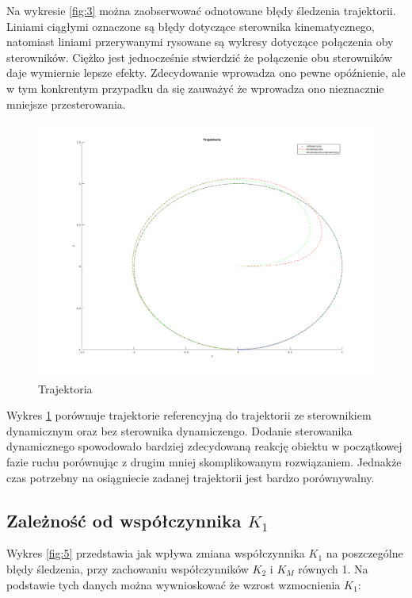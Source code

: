 \documentclass[12pt,a4paper]{article}
\begin{document}
    Na wykresie \ref{fig:3} można zaobserwować odnotowane błędy śledzenia trajektorii. Liniami ciągłymi oznaczone są błędy dotyczące sterownika kinematycznego, natomiast liniami przerywanymi rysowane są wykresy dotyczące połączenia oby sterowników. Ciężko jest jednocześnie stwierdzić że połączenie obu sterowników daje wymiernie lepsze efekty. Zdecydowanie wprowadza ono pewne opóźnienie, ale w tym konkrentym przypadku da się zauważyć że wprowadza ono nieznacznie mniejsze przesterowania. 

    \begin{figure}[H]
      \centering
      \includegraphics[width=1\textwidth]{figures/dyn_trajektoria.png}
      \caption{Trajektoria}
      \label{fig:4}
    \end{figure}

    Wykres \ref{fig:4} porównuje trajektorie referencyjną do trajektorii ze sterownikiem dynamicznym oraz bez sterownika dynamiczengo. Dodanie sterowanika dynamicznego spowodowało bardziej zdecydowaną reakcję obiektu w początkowej fazie ruchu porównując z drugim mniej skomplikowanym rozwiązaniem. Jednakże czas potrzebny na osiągniecie zadanej trajektorii jest bardzo porównywalny. 

  \subsection{Zależność od współczynnika $K_1$}
  Wykres \ref{fig:5} przedstawia jak wpływa zmiana współczynnika $K_1$ na poszczególne błędy śledzenia, przy zachowaniu współczynników $K_2$ i $K_M$ równych 1. Na podstawie tych danych można wywnioskować że wzrost wzmocnienia $K_1$:
\end{document}

